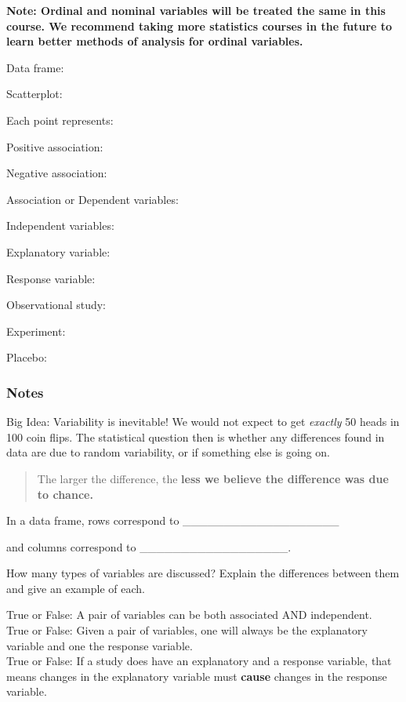 \documentclass[
]{report}
\newcommand{\rgs}{\vspace{12pt}} %
\newcommand{\rgi}{\hspace{24pt}}  %
\begin{document}
\textbf{Note: Ordinal and nominal variables will be treated the same in this course. We recommend taking more statistics courses in the future to learn better methods of analysis for ordinal variables.}

Data frame:
\rgs

Scatterplot:
\rgs

\rgi Each point represents:

\rgi Positive association:

\rgi Negative association:

Association or Dependent variables:
\rgs

Independent variables:
\rgs

Explanatory variable:
\rgs

Response variable:
\rgs

Observational study:
\rgs

Experiment:
\rgs

Placebo:
\rgs

\hypertarget{notes}{%
\subsubsection*{Notes}\label{notes}}

Big Idea: Variability is inevitable! We would not expect to get \emph{exactly} 50 heads in 100 coin flips. The statistical question then is whether any differences found in data are due to random variability, or if something else is going on.

\begin{quote}
The larger the difference, the \textbf{less we believe the difference was due to chance.}
\end{quote}

In a data frame, rows correspond to \_\_\_\_\_\_\_\_\_\_\_\_\_\_\_\_\_\_\_

and columns correspond to \_\_\_\_\_\_\_\_\_\_\_\_\_\_\_\_\_\_.

How many types of variables are discussed? Explain the differences between them and give an example of each.
\rgs
\rgs

True or False: A pair of variables can be both associated AND independent.\\
True or False: Given a pair of variables, one will always be the explanatory variable and one the response variable.\\
True or False: If a study does have an explanatory and a response variable, that means changes in the explanatory variable must \textbf{cause} changes in the response variable.
\end{document}

